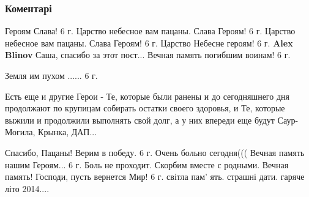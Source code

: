  
 
 
 
 
\subsubsection{Коментарі}
\label{sec:30_07_2015.fb.blinov_alex.1.voiny_vsu_shahtersk.cmt}

\begin{itemize} %
Героям Слава!
6 г.
Царство небесное вам пацаны. Слава Героям!
6 г.
Царство небесное вам пацаны. Слава Героям!
6 г.
Царство Небесне героям!
6 г.
\textbf{Alex Blinov} Саша, спасибо за этот пост...
Вечная память погибшим воинам!
6 г.

Земля им пухом ......
6 г.

Есть еще и другие Герои - Те, которые были ранены и до сегодняшнего дня
продолжают по крупицам собирать остатки своего здоровья, и Те, которые выжили и
продолжили выполнять свой долг, а у них впереди еще будут Саур-Могила, Крынка,
ДАП...

Спасибо, Пацаны!
Верим в победу.
6 г.
Очень больно сегодня((( Вечная память нашим Героям...
6 г.
Боль не проходит. Скорбим вместе с родными. Вечная память! Господи, пусть вернется Мир!
6 г.
світла пам' ять.
страшні дати.
гаряче літо 2014....
\end{itemize} %

